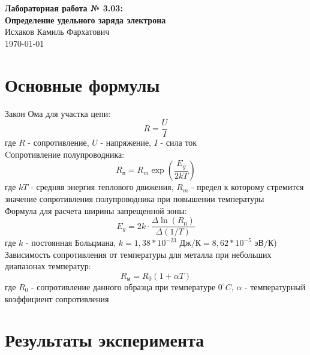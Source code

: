 \documentclass{article}%
\begin{document}
%
\normalsize%
\begin{center}%
\vspace*{\fill}%
{\LARGE\textbf{Лабораторная работа № 3.03: \\ Определение удельного заряда электрона}}\\[1cm]%
{\Large Исхаков Камиль Фархатович}\\[1cm]%
{\Large \today}%
\vspace*{\fill}%
\end{center}%
\newpage%
\section{Основные формулы}%
\label{sec:}%
Закон Ома для участка цепи:\begin{displaymath}R=\frac{U}{I}\end{displaymath}%
\newline%
где $R$ - сопротивление, $U$ - напряжение, $I$ -  сила ток\\%
Cопротивление полупроводника:\begin{displaymath}R_{\text{п}} = R_m\exp{(\frac{E_g}{2kT})}\end{displaymath}%
\newline%
где $kT$ - средняя энергия теплового движения, $R_m$ - предел к которому стремится значение сопротивления полупроводника при повышении температуры\\%
Формула для расчета ширины запрещенной зоны:\begin{displaymath}E_g=2k \cdot \frac{\Delta \ln({R_{\text{п}}})}{\Delta (1/T)}\end{displaymath}%
\newline%
где $k$ - постоянная Больцмана, $k=1,38*10^{-23} \textit{ Дж/К}=8,62*10^{-5}\textit{ эВ/К}$)\\%
Зависимость сопротивления от температуры для металла при небольших диапазонах температур:\begin{displaymath}R_{\text{м}} = R_0(1+\alpha T)\end{displaymath}%
\newline%
где $R_0$ - сопротивление данного образца при температуре $0^\circ C$, $\alpha$ - температурный коэффициент сопротивления\\

%
\section{Результаты эксперимента}%
\label{sec:}%
\end{document}
